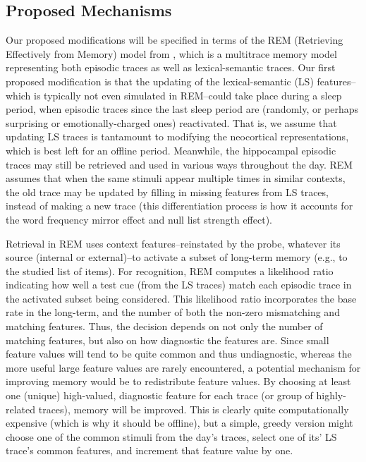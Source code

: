 \documentclass[10pt,letterpaper]{article}
\begin{document}
\vspace{-.2cm}
\subsection{Proposed Mechanisms}
\vspace{-.1cm}
Our proposed modifications will be specified in terms of the REM (Retrieving Effectively from Memory) model from , which is a multitrace memory model representing both episodic traces as well as lexical-semantic traces. Our first proposed modification is that the updating of the lexical-semantic (LS) features--which is typically not even simulated in REM--could take place during a sleep period, when episodic traces since the last sleep period are (randomly, or perhaps surprising or emotionally-charged ones) reactivated. That is, we assume that updating LS traces is tantamount to modifying the neocortical representations, which is best left for an offline period. Meanwhile, the hippocampal episodic traces may still be retrieved and used in various ways throughout the day. REM assumes that when the same stimuli appear multiple times in similar contexts, the old trace may be updated by filling in missing features from LS traces, instead of making a new trace (this differentiation process is how it accounts for the word frequency mirror effect and null list strength effect).

Retrieval in REM uses context features--reinstated by the probe, whatever its source (internal or external)--to activate a subset of long-term memory (e.g., to the studied list of items). For recognition, REM computes a likelihood ratio indicating how well a test cue (from the LS traces) match each episodic trace in the activated subset being considered. This likelihood ratio incorporates the base rate in the long-term, and the number of both the non-zero mismatching and matching features. Thus, the decision depends on not only the number of matching features, but also on how diagnostic the features are. Since small feature values will tend to be quite common and thus undiagnostic, whereas the more useful large feature values are rarely encountered, a potential mechanism for improving memory would be to redistribute feature values. By choosing at least one (unique) high-valued, diagnostic feature for each trace (or group of highly-related traces), memory will be improved. This is clearly quite computationally expensive (which is why it should be offline), but a simple, greedy version might choose one of the common stimuli from the day's traces, select one of its' LS trace's common features, and increment that feature value by one. 
\end{document}
